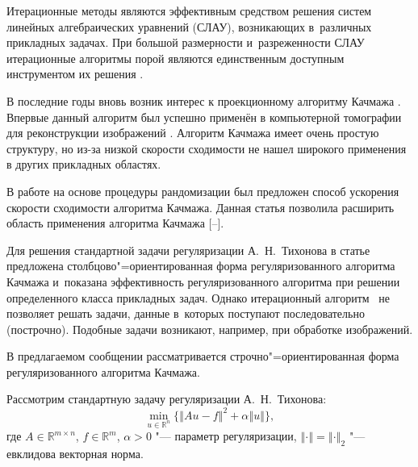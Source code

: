 \date{}

\renewcommand{\JournalDataOnline}{\displaydate{sidorove}}



\makerutitle


Итерационные методы являются эффективным средством решения систем линейных алгебраических уравнений (СЛАУ), возникающих в~различных прикладных задачах. 
При большой размерности и~разреженности СЛАУ итерационные алгоритмы порой являются единственным доступным инструментом их решения \cite{zhdanovsid:bib:Saad}.

В последние годы вновь возник интерес к проекционному алгоритму Качмажа \cite{zhdanovsid:bib:Kaczmarz}. 
Впервые данный алгоритм был успешно применён в компьютерной томографии для реконструкции изображений \cite{zhdanovsid:bib:Gordon}. 
Алгоритм Качмажа имеет очень простую структуру, но из-за низкой скорости сходимости не нашел широкого применения в других прикладных областях. 

В работе \cite{zhdanovsid:bib:Strohmer} на основе процедуры рандомизации был предложен способ ускорения скорости сходимости алгоритма Качмажа. 
Данная статья позволила расширить область применения алгоритма Качмажа
[--].%

Для решения стандартной задачи регуляризации А.~Н.~Тихонова в статье \cite{zhdanovsid:bib:Ivanov} предложена столбцово"=ориентированная форма регуляризованного алгоритма Качмажа и~показана эффективность регуляризованного алгоритма при решении определенного класса прикладных задач. 
Однако итерационный алгоритм~\cite{zhdanovsid:bib:Ivanov} не позволяет решать задачи, данные в~которых  поступают последовательно (построчно). 
Подобные задачи возникают, например, при обработке изображений.

В предлагаемом сообщении рассматривается строчно"=ориентированная форма регуляризованного алгоритма Качмажа.

\smallskip

Рассмотрим стандартную задачу регуляризации А.~Н.~Тихонова:
\begin{equation}
\label{eq:sid:eq1}
\underset{u\in\mathbb{R}^n}{\min}\bigl\lbrace\left\Vert Au-f \right\Vert^2+\alpha\left\Vert u\right\Vert \bigr\rbrace,
\end{equation}
где $A\in \mathbb{R}^{m\times n}$, $f\in\mathbb{R}^m$, $\alpha> 0$ "--- параметр регуляризации, $\left \Vert \cdot \right \Vert = \left \Vert \cdot \right \Vert_2$ "--- евклидова векторная норма.



